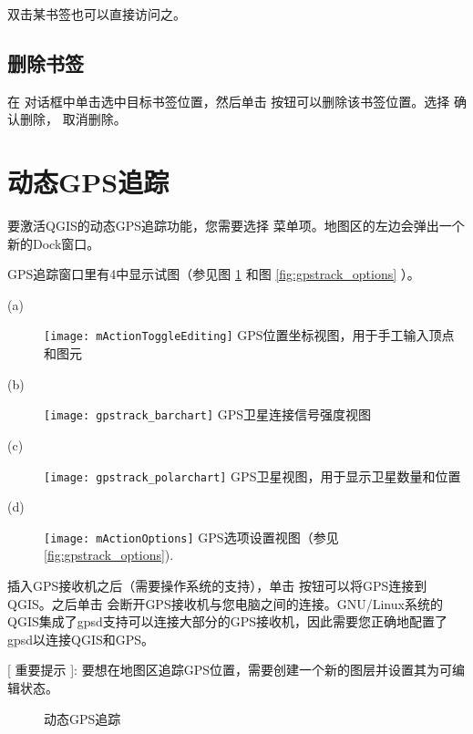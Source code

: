 双击某书签也可以直接访问之。

\subsection{删除书签}
在  对话框中单击选中目标书签位置，然后单击  按钮可以删除该书签位置。选择  确认删除， 取消删除。

\section{动态GPS追踪}\label{sec:gpstracking}

要激活QGIS的动态GPS追踪功能，您需要选择  \arrow {} 菜单项。地图区的左边会弹出一个新的Dock窗口。

GPS追踪窗口里有4中显示试图（参见图 \ref{fig:gpstrack_live} 和图 \ref{fig:gpstrack_options} ）。

\begin{description}
 \item[(a)] \texttt{[image: mActionToggleEditing]} GPS位置坐标视图，用于手工输入顶点和图元
 \item[(b)] \texttt{[image: gpstrack\_barchart]} GPS卫星连接信号强度视图
 \item[(c)] \texttt{[image: gpstrack\_polarchart]} GPS卫星视图，用于显示卫星数量和位置
 \item[(d)] \texttt{[image: mActionOptions]} GPS选项设置视图（参见 \ref{fig:gpstrack_options}).
\end{description}

插入GPS接收机之后（需要操作系统的支持），单击  按钮可以将GPS连接到QGIS。之后单击  会断开GPS接收机与您电脑之间的连接。GNU/Linux系统的QGIS集成了gpsd支持可以连接大部分的GPS接收机，因此需要您正确地配置了gpsd以连接QGIS和GPS。

[ 重要提示 ]: 要想在地图区追踪GPS位置，需要创建一个新的图层并设置其为可编辑状态。

\begin{figure}[ht]
\centering
     \hspace{0.33cm}
     \hspace{0.33cm}
\caption{动态GPS追踪 \nixcaption} \label{fig:gpstrack_live}
\end{figure}


